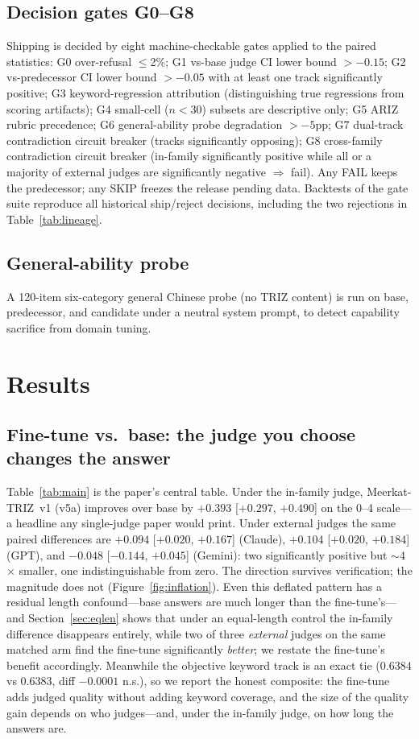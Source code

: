 \documentclass[11pt]{article}
\newcommand{\model}{Meerkat-TRIZ}
\begin{document}
\subsection{Decision gates G0--G8}
\label{sec:gates}
Shipping is decided by eight machine-checkable gates applied to the
paired statistics: G0 over-refusal $\leq$2\%; G1 vs-base judge CI lower
bound $>-0.15$; G2 vs-predecessor CI lower bound $>-0.05$ with at least
one track significantly positive; G3 keyword-regression attribution
(distinguishing true regressions from scoring artifacts); G4 small-cell
($n{<}30$) subsets are descriptive only; G5 ARIZ rubric precedence; G6
general-ability probe degradation $>-5$pp; G7 dual-track contradiction
circuit breaker (tracks significantly opposing); G8 cross-family
contradiction circuit breaker (in-family significantly positive while
all or a majority of external judges are significantly negative $\Rightarrow$
fail). Any FAIL keeps the predecessor; any SKIP freezes the release
pending data. Backtests of the gate suite reproduce all historical
ship/reject decisions, including the two rejections in
Table~\ref{tab:lineage}.

\subsection{General-ability probe}
A 120-item six-category general Chinese probe (no TRIZ content) is run
on base, predecessor, and candidate under a neutral system prompt, to
detect capability sacrifice from domain tuning.


\section{Results}
\label{sec:results}

\subsection{Fine-tune vs.\ base: the judge you choose changes the answer}
Table~\ref{tab:main} is the paper's central table. Under the in-family
judge, \model~v1 (v5a) improves over base by $+0.393$
[$+0.297$, $+0.490$] on the 0--4 scale---a headline any single-judge
paper would print. Under external judges the same paired differences
are $+0.094$ [$+0.020$, $+0.167$] (Claude), $+0.104$
[$+0.020$, $+0.184$] (GPT), and $-0.048$ [$-0.144$, $+0.045$]
(Gemini): two significantly positive but $\sim$4$\times$ smaller, one
indistinguishable from zero. The direction survives verification; the
magnitude does not (Figure~\ref{fig:inflation}). Even this deflated
pattern has a residual length confound---base answers are much longer
than the fine-tune's---and Section~\ref{sec:eqlen} shows that under an
equal-length control the in-family difference disappears entirely,
while two of three \emph{external} judges on the same matched arm find
the fine-tune significantly \emph{better}; we restate the fine-tune's
benefit accordingly. Meanwhile the objective keyword track is an exact
tie ($0.6384$ vs $0.6383$, diff $-0.0001$ n.s.), so we report the
honest composite: the fine-tune adds judged quality without adding
keyword coverage, and the size of the quality gain depends on who
judges---and, under the in-family judge, on how long the answers are.
\end{document}
